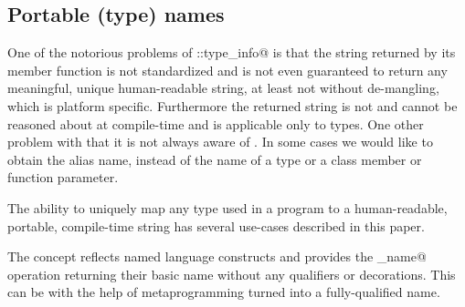 \subsection{Portable (type) names}

One of the notorious problems of \verb@std::type_info@ is that the string
returned by its \verb@name@ member function is not standardized and is
not even guaranteed to return any meaningful, unique human-readable string,
at least not without de-mangling, which is platform specific.
Furthermore the returned string is not \verb@constexpr@ and cannot be
reasoned about at compile-time and is applicable only to types.
One other problem with \verb@typeid@ that it is not always aware of \verb@typedef@s.
In some cases we would like to obtain the alias name, instead of the
 name of a type or a class member or function parameter.

The ability to uniquely map any type used in a program to a human-readable,
portable, compile-time string has several use-cases described in this paper.

The  concept reflects named language constructs
and provides the \verb@get_name@ operation
returning their basic name without any qualifiers or decorations.
This can be with the help of metaprogramming turned into a fully-qualified
name.

